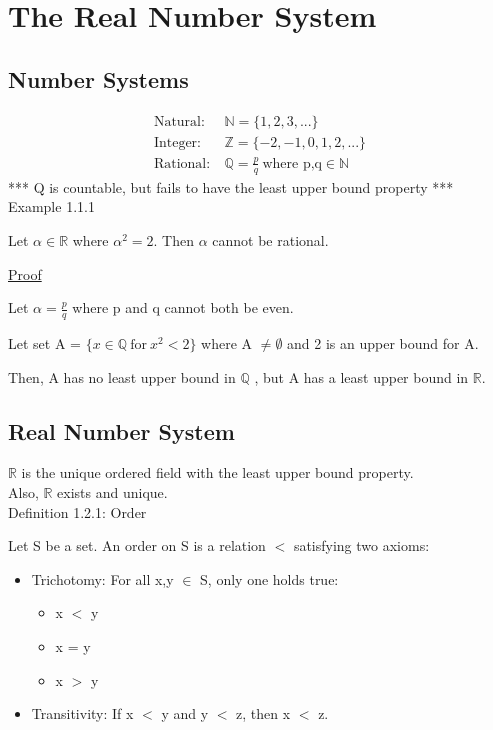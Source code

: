 \newpage
\section[Day 1: The Real Number System]{The Real Number System}





\subsection{Number Systems}

\begin{align*}
	\text{Natural}:\ & \mathbb{N} = \{1, 2, 3, ... \} \\	
	\text{Integer}:\ & \mathbb{Z} = \{-2, -1, 0, 1, 2, ... \} \\
	\text{Rational}:\ & \mathbb{Q} = \frac{p}{q} \ \text{where p,q} \in \mathbb{N}
\end{align*}
*** Q is countable, but fails to have the least upper bound property *** \\

{ \color{purple} Example 1.1.1 }

\qquad Let $ \alpha \in \mathbb{R} $ where $ \alpha^2 = 2 $. Then $ \alpha $ cannot be rational.

{ \color{magenta} \underline{Proof} }

Let $ \alpha = \frac{p}{q} $ where p and q cannot both be even.

Let set A = $\{ x \in \mathbb{Q} \ \text{for} \ x^2 < 2 \} $ where A $ \neq \emptyset $
and 2 is an upper bound for A.

Then, A has no least upper bound in $ \mathbb{Q} $ , but A has a least upper bound in $ \mathbb{R} $.





\subsection{Real Number System}

$ \mathbb{R} $ is the unique ordered field with the least upper bound property. \\
Also, $ \mathbb{R} $ exists and unique. \\

{ \color{blue} Definition 1.2.1: Order }

\qquad Let S be a set. An order on S is a relation $<$ satisfying two axioms:

\begin{itemize}[leftmargin=2cm]
	\item { \color{lblue} Trichotomy}: For all x,y $ \in $ S, only one holds true:
		\begin{itemize}[leftmargin=1cm]
			\item x $<$ y
			\item x = y
			\item x $>$ y
		\end{itemize}
	
	\item { \color{lblue} Transitivity}: If x $<$ y and y $<$ z, then x $<$ z.
\end{itemize}

